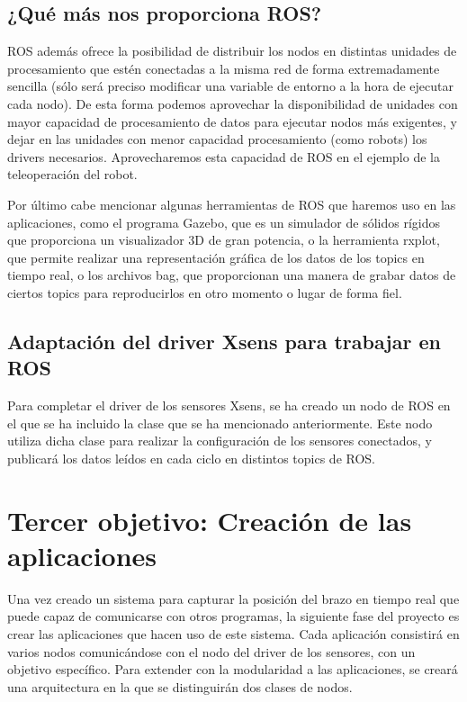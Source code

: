 \documentclass[12pt,a4paper]{article}
\begin{document}
\subsection{¿Qué más nos proporciona ROS?}

ROS además ofrece la posibilidad de distribuir los nodos en distintas unidades de procesamiento que estén conectadas a la misma red de forma extremadamente sencilla (sólo será preciso modificar una variable de entorno a la hora de ejecutar cada nodo). De esta forma podemos aprovechar la disponibilidad de unidades con mayor capacidad de procesamiento de datos para ejecutar nodos más exigentes, y dejar en las unidades con menor capacidad procesamiento (como robots) los drivers necesarios. Aprovecharemos esta capacidad de ROS en el ejemplo de la teleoperación del robot.

Por último cabe mencionar algunas herramientas de ROS que haremos uso en las aplicaciones, como el programa Gazebo, que es un simulador de sólidos rígidos que proporciona un visualizador 3D de gran potencia, o la herramienta rxplot, que permite realizar una representación gráfica de los datos de los topics en tiempo real, o los archivos bag, que proporcionan una manera de grabar datos de ciertos topics para reproducirlos en otro momento o lugar de forma fiel.

\subsection{Adaptación del driver Xsens para trabajar en ROS}

Para completar el driver de los sensores Xsens, se ha creado un nodo de ROS en el que se ha incluido la clase que se ha mencionado anteriormente. Este nodo utiliza dicha clase para realizar la configuración de los sensores conectados, y publicará los datos leídos en cada ciclo en distintos topics de ROS.

\section{Tercer objetivo: Creación de las aplicaciones}

Una vez creado un sistema para capturar la posición del brazo en tiempo real que puede capaz de comunicarse con otros programas, la siguiente fase del proyecto es crear las aplicaciones que hacen uso de este sistema. Cada aplicación consistirá en varios nodos comunicándose con el nodo del driver de los sensores, con un objetivo específico. Para extender con la modularidad a las aplicaciones, se creará una arquitectura en la que se distinguirán dos clases de nodos.
\end{document}

